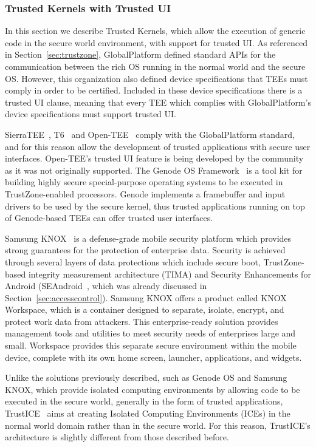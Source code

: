 \subsubsection{Trusted Kernels with Trusted UI}

In this section we describe Trusted Kernels, which allow the execution of generic code in the secure world environment, with support for trusted UI. As referenced in Section~\ref{sec:trustzone}, GlobalPlatform defined standard APIs for the communication between the rich OS running in the normal world and the secure OS. However, this organization also defined device specifications that TEEs must comply in order to be certified. Included in these device specifications there is a trusted UI clause, meaning that every TEE which complies with GlobalPlatform's device specifications must support trusted UI. 

SierraTEE~\cite{sierra_tee}, T6~\cite{t6_tee} and Open-TEE~\cite{mcgillion2015open} comply with the GlobalPlatform standard, and for this reason allow the development of trusted applications with secure user interfaces. Open-TEE's trusted UI feature is being developed by the community as it was not originally supported. The Genode OS Framework~\cite{genode} is a tool kit for building highly secure special-purpose operating systems to be executed in TrustZone-enabled processors. Genode implements a framebuffer and input drivers to be used by the secure kernel, thus trusted applications running on top of Genode-based TEEs can offer trusted user interfaces.

Samsung KNOX~\cite{knox_whitepaper} is a defense-grade mobile security platform which provides strong guarantees for the protection of enterprise data. Security is achieved through several layers of data protections which include secure boot, TrustZone-based integrity measurement architecture (TIMA) and Security Enhancements for Android (SEAndroid~\cite{smalley2013security}, which was already discussed in Section~\ref{sec:accesscontrol}). Samsung KNOX offers a product called KNOX Workspace, which is a container designed to separate, isolate, encrypt, and protect work data from attackers. This enterprise-ready solution provides management tools and utilities to meet security needs of enterprises large and small. Workspace provides this separate secure environment within the mobile device, complete with its own home screen, launcher, applications, and widgets.

Unlike the solutions previously described, such as Genode OS and Samsung KNOX, which provide isolated computing environments by allowing code to be executed in the secure world, generally in the form of trusted applications, TrustICE~\cite{sun2015trustice} aims at creating Isolated Computing Environments (ICEs) in the normal world domain rather than in the secure world. For this reason, TrustICE's architecture is slightly different from those described before.

